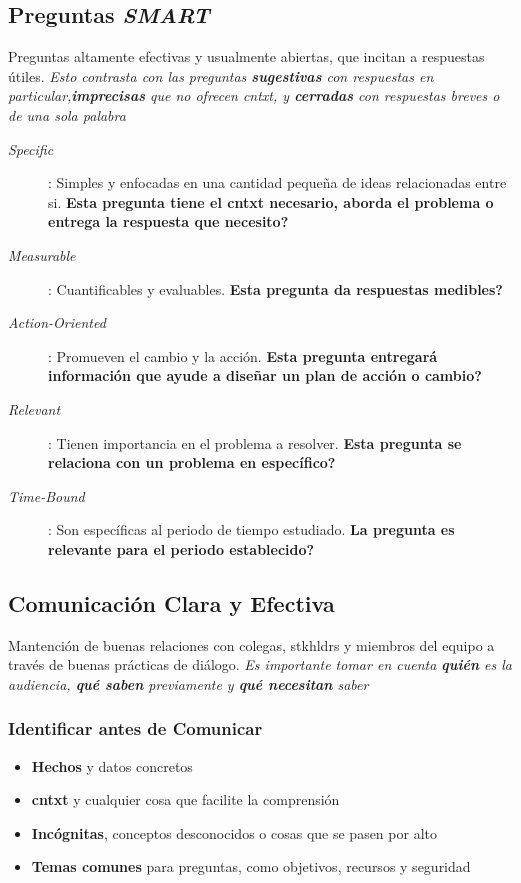 \subsection{Preguntas \textit{SMART}}
Preguntas altamente efectivas y usualmente abiertas, que incitan a respuestas útiles. \textit{Esto contrasta con las preguntas \textbf{sugestivas} con respuestas en particular,\textbf{imprecisas} que no ofrecen \gls{cntxt}, y \textbf{cerradas} con respuestas breves o de una sola palabra}
\begin{description}
    \item [\textit{Specific}]{ : Simples y enfocadas en una cantidad pequeña de ideas relacionadas entre si. \textbf{Esta pregunta tiene el \gls{cntxt} necesario, aborda el problema o entrega la respuesta que necesito?}}
    \item [\textit{Measurable}]{ : Cuantificables y evaluables. \textbf{Esta pregunta da respuestas medibles?}}
    \item [\textit{Action-Oriented}]{ : Promueven el cambio y la acción. \textbf{Esta pregunta entregará información que ayude a diseñar un plan de acción o cambio?}}
    \item [\textit{Relevant}]{ : Tienen importancia en el problema a resolver. \textbf{Esta pregunta se relaciona con un problema en específico?}}
    \item [\textit{Time-Bound}]{ : Son específicas al periodo de tiempo estudiado. \textbf{La pregunta es relevante para el periodo establecido?}}
\end{description}

\subsection{Comunicación Clara y Efectiva}
Mantención de buenas relaciones con colegas, \gls{stkhldrs} y miembros del equipo a través de buenas prácticas de diálogo. \textit{Es importante tomar en cuenta \textbf{quién} es la audiencia, \textbf{qué saben} previamente y \textbf{qué necesitan} saber}

\subsubsection{Identificar antes de Comunicar}
\begin{itemize}
    \item {\textbf{Hechos} y datos concretos}
    \item {\textbf{\gls{cntxt}} y cualquier cosa que facilite la comprensión}
    \item {\textbf{Incógnitas}, conceptos desconocidos o cosas que se pasen por alto}
    \item {\textbf{Temas comunes} para preguntas, como objetivos, recursos y seguridad}
\end{itemize}

